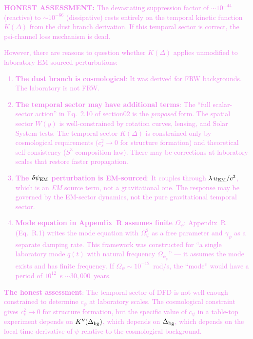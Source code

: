 \documentclass[11pt]{article}
\newcommand{\Opsi}{\Omega_\psi}
\newcommand{\gpsi}{\gamma_\psi}
\newcommand{\dpsiEM}{\delta\psi_{\rm EM}}
\newcommand{\honest}[1]{\textcolor{violet}{\textbf{HONEST ASSESSMENT:} #1}}
\theoremstyle{definition}
\theoremstyle{remark}
\begin{document}
\honest{The devastating suppression factor of $\sim 10^{-44}$
(reactive) to $\sim 10^{-66}$ (dissipative) rests entirely on
the temporal kinetic function $K(\Delta)$ from the dust branch
derivation. If this temporal sector is correct, the psi-channel
loss mechanism is dead.

However, there are reasons to question whether $K(\Delta)$ applies
unmodified to laboratory EM-sourced perturbations:

\begin{enumerate}
\item \textbf{The dust branch is cosmological}: It was derived for
  FRW backgrounds. The laboratory is not FRW.

\item \textbf{The temporal sector may have additional terms}: The
  ``full scalar-sector action'' in Eq.~2.10 of section02 is the
  \emph{proposed} form. The spatial sector $W(y)$ is well-constrained
  by rotation curves, lensing, and Solar System tests. The temporal
  sector $K(\Delta)$ is constrained only by cosmological requirements
  ($c_s^2 \to 0$ for structure formation) and theoretical self-consistency
  ($S^3$ composition law). There may be corrections at laboratory scales
  that restore faster propagation.

\item \textbf{The $\dpsiEM$ perturbation is EM-sourced}: It couples
  through $\lambda\,u_{\rm EM}/c^2$, which is an \emph{EM} source
  term, not a gravitational one. The response may be governed by the
  EM-sector dynamics, not the pure gravitational temporal sector.

\item \textbf{Mode equation in Appendix~R assumes finite $\Opsi$}:
  Appendix~R (Eq.~R.1) writes the mode equation with $\Opsi^2$ as a
  free parameter and $\gpsi$ as a separate damping rate. This
  framework was constructed for ``a single laboratory mode $q(t)$
  with natural frequency $\Opsi_\psi$'' --- it assumes the mode exists
  and has finite frequency. If $\Opsi \sim 10^{-12}$~rad/s, the
  ``mode'' would have a period of $10^{12}$~s $\sim 30{,}000$~years.
\end{enumerate}

\textbf{The honest assessment}: The temporal sector of DFD is not
well enough constrained to determine $c_\psi$ at laboratory scales.
The cosmological constraint gives $c_s^2 \to 0$ for structure
formation, but the specific value of $c_\psi$ in a table-top
experiment depends on $K''(\Delta_{\rm bg})$, which depends on
$\Delta_{\rm bg}$, which depends on the local time derivative of
$\psi$ relative to the cosmological background.}
\end{document}

